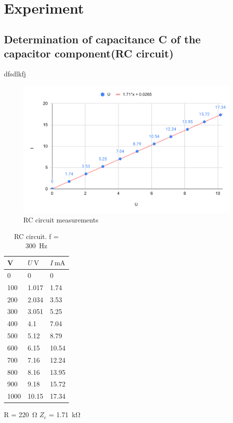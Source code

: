 \section{Experiment}

\subsection{Determination of capacitance C of the capacitor component(RC circuit)}
dfsdlkfj

\begin{figure}[H]
	\centering
	\includegraphics[width=14cm]{schematics/capacitor.pdf}
	\caption{RC circuit measurements }
	\label{fig:capacitance}
\end{figure}

\begin{table}[!ht]
    \centering
    \begin{tabular}{l|l|l}

         V & $U \SI{}{\volt}$ & $I \SI{}{\milli\ampere}$ \\ \hline
        0 & 0 & 0 \\ 
        100 & 1.017 & 1.74 \\ 
        200 & 2.034 & 3.53 \\ 
        300 & 3.051 & 5.25 \\ 
        400 & 4.1 & 7.04 \\ 
        500 & 5.12 & 8.79 \\ 
        600 & 6.15 & 10.54 \\ 
        700 & 7.16 & 12.24 \\ 
        800 & 8.16 & 13.95 \\ 
        900 & 9.18 & 15.72 \\ 
        1000 & 10.15 & 17.34 \\ 
    \end{tabular}
    \caption{RC circuit. f = \SI{300}{\hertz}} R = \SI{220}{\ohm} $Z_c$ = \SI{1.71}{\kilo\ohm}
    \label{tab:capacitance}
\end{table}

